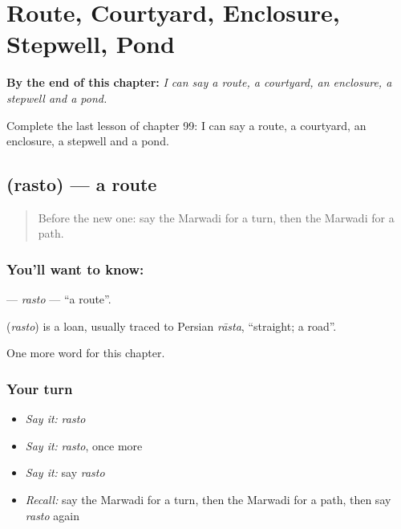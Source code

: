 
\chapter{Route, Courtyard, Enclosure, Stepwell, Pond}
\label{ch:mw-route-courtyard-enclosure-stepwell-pond}

\begin{chapteropening}
\textbf{By the end of this chapter:} \emph{I can say a route, a courtyard, an enclosure, a stepwell and a pond.}

Complete the last lesson of chapter 99: I can say a route, a courtyard, an enclosure, a stepwell and a pond.
\end{chapteropening}

\section[\texorpdfstring{\mw{रस्तो} (rasto)}{रस्तो (rasto)}]{ (rasto) — a route}

\label{lesson:MW-C99-rasto}



\begin{quote}
Before the new one: say the Marwadi for a turn, then the Marwadi for a path.
\end{quote}

\subsection*{You'll want to know: }
\textbf{} — \emph{rasto} — \textquotedblleft{}a route\textquotedblright{}.

\begin{cousinweb}
\textbf{} (\emph{rasto}) is a loan, usually traced to Persian \emph{rāsta}, \textquotedblleft{}straight; a road\textquotedblright{}.
\end{cousinweb}

\begin{grammarlens}[title={What you've built}]
One more word for this chapter.
\end{grammarlens}

\subsection*{Your turn}
\begin{itemize}
\raggedright
  \item \emph{Say it:} \emph{rasto}
  \item \emph{Say it:} \emph{rasto}, once more
  \item \emph{Say it:} say \emph{rasto}
  \item \emph{Recall:} say the Marwadi for a turn, then the Marwadi for a path, then say \emph{rasto} again
\end{itemize}

